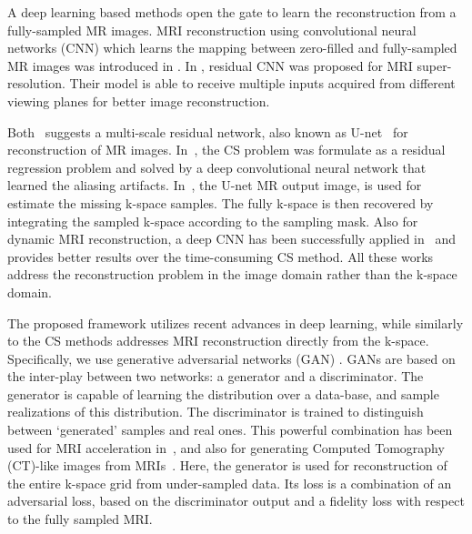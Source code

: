 \documentclass[review]{elsarticle}
\begin{document}
A deep learning based methods open the gate to learn the reconstruction from a fully-sampled MR images. MRI reconstruction using convolutional neural networks (CNN) which learns the mapping between zero-filled and fully-sampled MR images was introduced in \cite{wang2016accelerating}. In \cite{Oktay2016}, residual CNN was proposed for MRI super-resolution. Their model is able to receive multiple inputs acquired from different viewing planes for better image reconstruction. 

Both~\cite{lee2017deep,hyun2017deep} suggests a multi-scale residual network, also known as U-net~\cite{ronneberger2015u} for reconstruction of MR images. In~\cite{lee2017deep}, the CS problem was formulate as a residual regression problem and solved by a deep convolutional neural network that learned the aliasing artifacts. In~\cite{hyun2017deep}, the U-net MR output image, is used for estimate the missing k-space samples. The fully k-space is then recovered by integrating the sampled k-space according to the sampling mask. Also for dynamic MRI reconstruction, a deep CNN has been successfully applied in~\cite{sandinodeep} and provides better results over the time-consuming CS method. All these works address the reconstruction problem in the image domain rather than the k-space domain.

The proposed framework utilizes recent advances in deep learning, while similarly to the CS methods addresses MRI reconstruction directly from the k-space. Specifically, we use generative adversarial networks (GAN) \cite{goodfellow2014generative,radford2015unsupervised,pathak2016context}. 
GANs are based on the inter-play between two networks: a generator and a discriminator. The generator is capable of learning the distribution over a data-base, and sample realizations of this distribution. 
The discriminator is trained to distinguish between `generated' samples and real ones. This powerful combination has been used for MRI acceleration in~\cite{yu2017deep,mardani2017deep}, and also for generating Computed Tomography (CT)-like images from MRIs~\cite{nie2016medical}.
Here, the generator is used for reconstruction of the entire k-space grid from under-sampled data. Its loss is a combination of an adversarial loss, based on the discriminator output and a fidelity loss with respect to the fully sampled MRI. 
\end{document}
